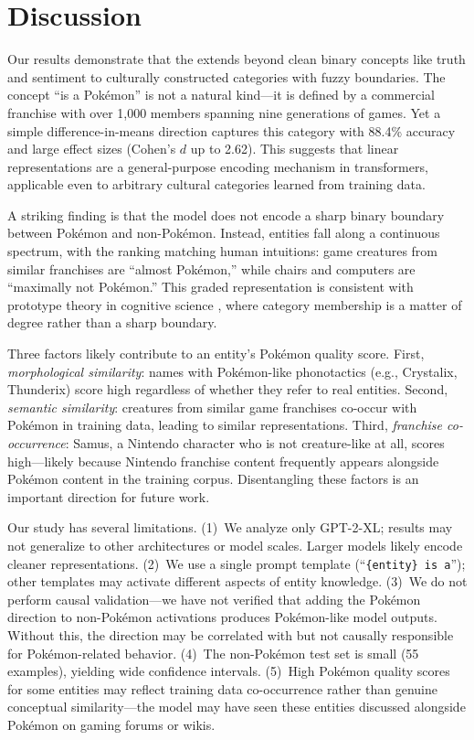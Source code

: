 \section{Discussion}
\label{sec:discussion}

Our results demonstrate that the \lrh extends beyond clean binary concepts like truth and sentiment to culturally constructed categories with fuzzy boundaries. The concept ``is a Pok\'{e}mon'' is not a natural kind---it is defined by a commercial franchise with over 1,000 members spanning nine generations of games. Yet a simple difference-in-means direction captures this category with 88.4\% accuracy and large effect sizes (Cohen's $d$ up to 2.62). This suggests that linear representations are a general-purpose encoding mechanism in transformers, applicable even to arbitrary cultural categories learned from training data.

A striking finding is that the model does not encode a sharp binary boundary between Pok\'{e}mon and non-Pok\'{e}mon. Instead, entities fall along a continuous spectrum, with the ranking matching human intuitions: game creatures from similar franchises are ``almost Pok\'{e}mon,'' while chairs and computers are ``maximally not Pok\'{e}mon.'' This graded representation is consistent with prototype theory in cognitive science \citep{rosch1975cognitive}, where category membership is a matter of degree rather than a sharp boundary.

Three factors likely contribute to an entity's Pok\'{e}mon quality score. First, \textit{morphological similarity}: names with Pok\'{e}mon-like phonotactics (e.g., Crystalix, Thunderix) score high regardless of whether they refer to real entities. Second, \textit{semantic similarity}: creatures from similar game franchises co-occur with Pok\'{e}mon in training data, leading to similar representations. Third, \textit{franchise co-occurrence}: Samus, a Nintendo character who is not creature-like at all, scores high---likely because Nintendo franchise content frequently appears alongside Pok\'{e}mon content in the training corpus. Disentangling these factors is an important direction for future work.

Our study has several limitations. (1)~We analyze only GPT-2-XL; results may not generalize to other architectures or model scales. Larger models likely encode cleaner representations. (2)~We use a single prompt template (``\texttt{\{entity\} is a}''); other templates may activate different aspects of entity knowledge. (3)~We do not perform causal validation---we have not verified that adding the Pok\'{e}mon direction to non-Pok\'{e}mon activations produces Pok\'{e}mon-like model outputs. Without this, the direction may be correlated with but not causally responsible for Pok\'{e}mon-related behavior. (4)~The non-Pok\'{e}mon test set is small (55 examples), yielding wide confidence intervals. (5)~High Pok\'{e}mon quality scores for some entities may reflect training data co-occurrence rather than genuine conceptual similarity---the model may have seen these entities discussed alongside Pok\'{e}mon on gaming forums or wikis.

